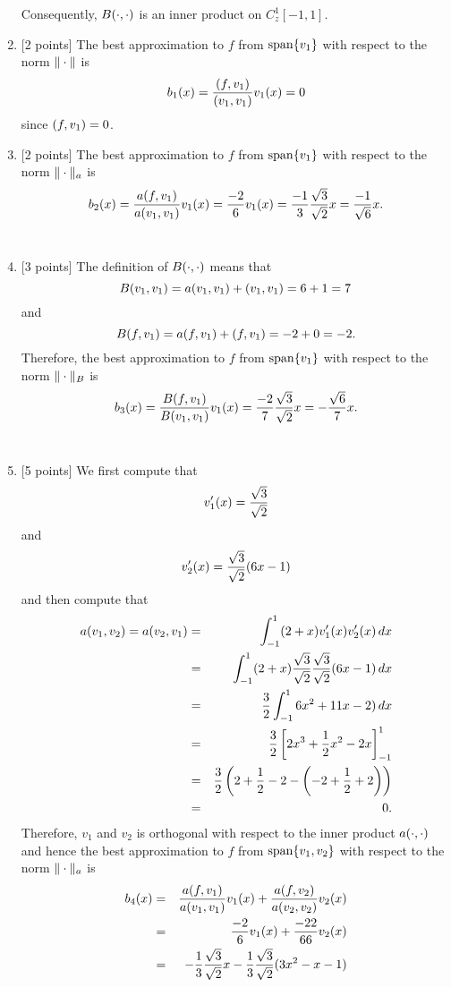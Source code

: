 \begin{solution}
\begin{enumerate}
Consequently, $B(\cdot,\cdot)$ is an inner product on $C_z^1[-1,1]$.
\\
\item {[2 points]} The best approximation to $f$ from ${\rm span}\{v_1\}$ with respect to the norm $\|\cdot\|$ is
\[
b_1(x)={(f,v_1) \over (v_1,v_1)}v_1(x)=0
\]
since $(f,v_1)=0$.
\\
\item {[2 points]} The best approximation to $f$ from ${\rm span}\{v_1\}$ with respect to the norm $\|\cdot\|_a$ is
\[
b_2(x)={a(f,v_1) \over a(v_1,v_1)}v_1(x)={-2 \over 6}v_1(x)={-1 \over 3}{\sqrt{3} \over \sqrt{2}}x={-1 \over \sqrt{6}}x.
\]
\\
\item {[3 points]} The definition of $B(\cdot,\cdot)$ means that
\[
B(v_1,v_1)=a(v_1,v_1)+(v_1,v_1)=6+1=7
\]
and
\[
B(f,v_1)=a(f,v_1)+(f,v_1)=-2+0=-2.
\]
Therefore, the best approximation to $f$ from ${\rm span}\{v_1\}$ with respect to the norm $\|\cdot\|_B$ is
\[
b_3(x)={B(f,v_1) \over B(v_1,v_1)}v_1(x)={-2 \over 7}{\sqrt{3} \over \sqrt{2}}x=-{\sqrt{6} \over 7}x.
\]
\\
\item {[5 points]} We first compute that
\[
v_1'(x)={\sqrt{3} \over \sqrt{2}}
\]
and
\[
v_2'(x)={\sqrt{3} \over \sqrt{2}}(6x-1)
\]
and then compute that
\begin{eqnarray*}
a(v_1,v_2)=a(v_2,v_1)&=&\int_{-1}^1(2+x)v_1'(x)v_2'(x)\,dx
\\
&=&\int_{-1}^1(2+x){\sqrt{3} \over \sqrt{2}}{\sqrt{3} \over \sqrt{2}}(6x-1)\,dx
\\
&=&{3 \over 2}\int_{-1}^16x^2+11x-2)\,dx
\\
&=&{3 \over 2}\left[2x^3+{1 \over 2}x^2-2x\right]_{-1}^1
\\
&=&{3 \over 2}\left(2+{1 \over 2}-2-\left(-2+{1 \over 2}+2\right)\right)
\\
&=&0.
\end{eqnarray*}
Therefore, $v_1$ and $v_2$ is orthogonal with respect to the inner product $a(\cdot,\cdot)$ and hence the best approximation to $f$ from ${\rm span}\{v_1,v_2\}$ with respect to the norm $\|\cdot\|_a$ is
\begin{eqnarray*}
b_4(x)&=&{a\ip{f,v_1} \over a\ip{v_1,v_1}}v_1(x)+{a\ip{f,v_2} \over a\ip{v_2,v_2}}v_2(x)
\\
&=&{-2 \over 6}v_1(x)+{-22 \over 66}v_2(x)
\\
&=&-{1 \over 3}{\sqrt{3} \over \sqrt{2}}x-{1 \over 3}{\sqrt{3} \over \sqrt{2}}(3x^2-x-1)

\end{eqnarray*}
\end{enumerate}
\end{solution}
